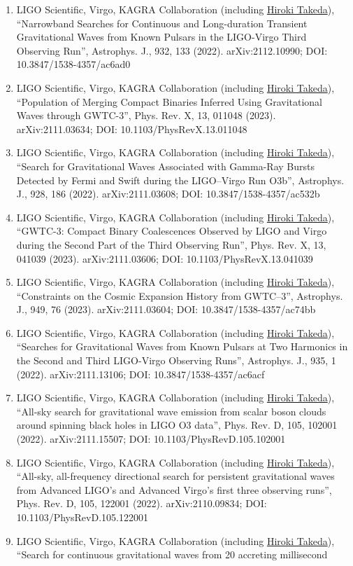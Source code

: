 \documentclass[uplatex, 11pt]{jsarticle}
\begin{document}
\begin{enumerate}
\item LIGO Scientific, Virgo, KAGRA Collaboration (including \uline{Hiroki Takeda}), “Narrowband Searches for Continuous and Long-duration Transient Gravitational Waves from Known Pulsars in the LIGO-Virgo Third Observing Run”, Astrophys. J., 932, 133 (2022). arXiv:2112.10990; DOI: 10.3847/1538-4357/ac6ad0
\item LIGO Scientific, Virgo, KAGRA Collaboration (including \uline{Hiroki Takeda}), “Population of Merging Compact Binaries Inferred Using Gravitational Waves through GWTC-3”, Phys. Rev. X, 13, 011048 (2023). arXiv:2111.03634; DOI: 10.1103/PhysRevX.13.011048
\item LIGO Scientific, Virgo, KAGRA Collaboration (including \uline{Hiroki Takeda}), “Search for Gravitational Waves Associated with Gamma-Ray Bursts Detected by Fermi and Swift during the LIGO–Virgo Run O3b”, Astrophys. J., 928, 186 (2022). arXiv:2111.03608; DOI: 10.3847/1538-4357/ac532b
\item LIGO Scientific, Virgo, KAGRA Collaboration (including \uline{Hiroki Takeda}), “GWTC-3: Compact Binary Coalescences Observed by LIGO and Virgo during the Second Part of the Third Observing Run”, Phys. Rev. X, 13, 041039 (2023). arXiv:2111.03606; DOI: 10.1103/PhysRevX.13.041039
\item LIGO Scientific, Virgo, KAGRA Collaboration (including \uline{Hiroki Takeda}), “Constraints on the Cosmic Expansion History from GWTC–3”, Astrophys. J., 949, 76 (2023). arXiv:2111.03604; DOI: 10.3847/1538-4357/ac74bb
\item LIGO Scientific, Virgo, KAGRA Collaboration (including \uline{Hiroki Takeda}), “Searches for Gravitational Waves from Known Pulsars at Two Harmonics in the Second and Third LIGO-Virgo Observing Runs”, Astrophys. J., 935, 1 (2022). arXiv:2111.13106; DOI: 10.3847/1538-4357/ac6acf
\item LIGO Scientific, Virgo, KAGRA Collaboration (including \uline{Hiroki Takeda}), “All-sky search for gravitational wave emission from scalar boson clouds around spinning black holes in LIGO O3 data”, Phys. Rev. D, 105, 102001 (2022). arXiv:2111.15507; DOI: 10.1103/PhysRevD.105.102001
\item LIGO Scientific, Virgo, KAGRA Collaboration (including \uline{Hiroki Takeda}), “All-sky, all-frequency directional search for persistent gravitational waves from Advanced LIGO's and Advanced Virgo's first three observing runs”, Phys. Rev. D, 105, 122001 (2022). arXiv:2110.09834; DOI: 10.1103/PhysRevD.105.122001
\item LIGO Scientific, Virgo, KAGRA Collaboration (including \uline{Hiroki Takeda}), “Search for continuous gravitational waves from 20 accreting millisecond

\end{enumerate}
\end{document}
